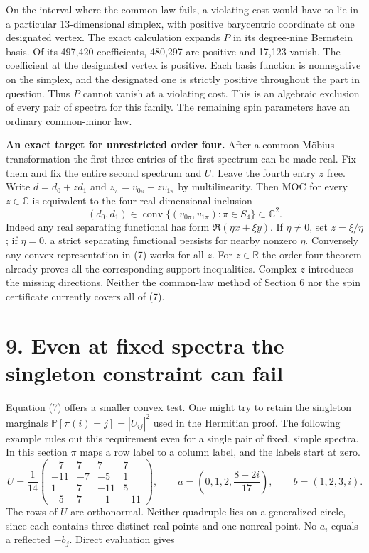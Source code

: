 \documentclass[11pt]{article}
\newcommand{\heading}[1]{\section*{\color{ink}#1}}
\newcommand{\C}{\mathbb C}\newcommand{\R}{\mathbb R}\newcommand{\E}{\mathbb E}\newcommand{\pr}{\mathbb P}
\DeclareMathOperator{\co}{conv}\DeclareMathOperator{\rank}{rank}\DeclareMathOperator{\tr}{tr}\DeclareMathOperator{\diag}{diag}
\begin{document}
\par On the interval where the common law fails, a violating cost would have to lie in a particular 13-dimensional simplex, with positive barycentric coordinate at one designated vertex. The exact calculation expands $P$ in its degree-nine Bernstein basis. Of its 497,420 coefficients, 480,297 are positive and 17,123 vanish. The coefficient at the designated vertex is positive. Each basis function is nonnegative on the simplex, and the designated one is strictly positive throughout the part in question. Thus $P$ cannot vanish at a violating cost. This is an algebraic exclusion of every pair of spectra for this family. The remaining spin parameters have an ordinary common-minor law.
\par\textbf{An exact target for unrestricted order four.} After a common M\"obius transformation the first three entries of the first spectrum can be made real. Fix them and fix the entire second spectrum and $U$. Leave the fourth entry $z$ free. Write $d=d_0+zd_1$ and $z_\pi=v_{0\pi}+zv_{1\pi}$ by multilinearity. Then MOC for every $z\in\C$ is equivalent to the four-real-dimensional inclusion
\[
 (d_0,d_1)\in\co\{(v_{0\pi},v_{1\pi}):\pi\in S_4\}\subset\C^2. \tag{7}
\]
Indeed any real separating functional has form $\Re(\eta x+\xi y)$. If $\eta\ne0$, set $z=\xi/\eta$; if $\eta=0$, a strict separating functional persists for nearby nonzero $\eta$. Conversely any convex representation in (7) works for all $z$. For $z\in\R$ the order-four theorem already proves all the corresponding support inequalities. Complex $z$ introduces the missing directions. Neither the common-law method of Section 6 nor the spin certificate currently covers all of (7).
\newpage
\heading{9. Even at fixed spectra the singleton constraint can fail}
Equation (7) offers a smaller convex test. One might try to retain the singleton marginals $\pr[\pi(i)=j]=|U_{ij}|^2$ used in the Hermitian proof. The following example rules out this requirement even for a single pair of fixed, simple spectra. In this section $\pi$ maps a row label to a column label, and the labels start at zero.
\[
 U=\frac1{14}\begin{pmatrix}-7&7&7&7\\-11&-7&-5&1\\1&7&-11&5\\-5&7&-1&-11\end{pmatrix},\qquad
 a=\left(0,1,2,\frac{8+2i}{17}\right),\qquad b=(1,2,3,i).
\]
The rows of $U$ are orthonormal. Neither quadruple lies on a generalized circle, since each contains three distinct real points and one nonreal point. No $a_i$ equals a reflected $-b_j$. Direct evaluation gives
\end{document}
